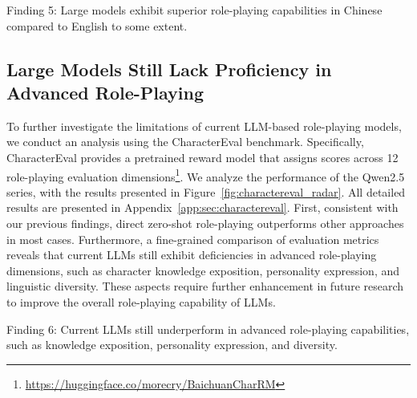 \begin{AIbox}
{Finding 5:}
Large models exhibit superior role-playing capabilities in Chinese compared to English to some extent.
\end{AIbox}


\subsection{Large Models Still Lack Proficiency in Advanced Role-Playing}
To further investigate the limitations of current LLM-based role-playing models, we conduct an analysis using the CharacterEval benchmark.
Specifically, CharacterEval provides a pretrained reward model that assigns scores across 12 role-playing evaluation dimensions\footnote{\url{https://huggingface.co/morecry/BaichuanCharRM}}. 
We analyze the performance of the Qwen2.5 series, with the results presented in Figure~\ref{fig:charactereval_radar}.
All detailed results are presented in Appendix~\ref{app:sec:charactereval}.
First, consistent with our previous findings, direct zero-shot role-playing outperforms other approaches in most cases.
Furthermore, a fine-grained comparison of evaluation metrics reveals that current LLMs still exhibit deficiencies in advanced role-playing dimensions, such as character knowledge exposition, personality expression, and linguistic diversity. 
These aspects require further enhancement in future research to improve the overall role-playing capability of LLMs.

\begin{AIbox}
{Finding 6:}
Current LLMs still underperform in advanced role-playing capabilities, such as knowledge exposition, personality expression, and diversity.
\end{AIbox}


